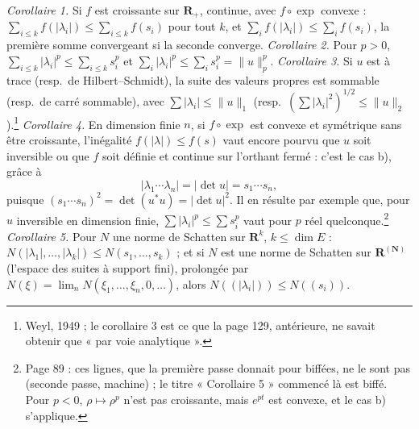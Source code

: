 \documentclass[11pt,a4paper]{article}
\begin{document}
\emph{Corollaire 1.} Si $f$ est croissante sur $\mathbf{R}_{+}$, continue,
avec $f\circ\exp$ convexe : $\sum_{i \leq k} f(|\lambda_i|) \leq \sum_{i
\leq k} f(s_i)$ pour tout $k$, et $\sum_i f(|\lambda_i|) \leq \sum_i f(s_i)$,
la première somme convergeant si la seconde converge.
\emph{Corollaire 2.} Pour $p > 0$, $\sum_{i \leq k} |\lambda_i|^p \leq
\sum_{i \leq k} s_i^p$ et $\sum_i |\lambda_i|^p \leq \sum_i s_i^p = \|u\|_p^p$.
\emph{Corollaire 3.} Si $u$ est à trace (resp.\ de Hilbert--Schmidt), la
suite des valeurs propres est sommable (resp.\ de carré sommable), avec
$\sum |\lambda_i| \leq \|u\|_1$ (resp.\ $(\sum |\lambda_i|^2)^{1/2} \leq
\|u\|_2$).\footnote{Weyl, 1949 ; le corollaire 3 est ce que la page 129,
antérieure, ne savait obtenir que « par voie analytique ».}
\emph{Corollaire 4.} En dimension finie $n$, si $f\circ\exp$ est convexe et
symétrique sans être croissante, l'inégalité $f(|\lambda|) \leq f(s)$ vaut
encore pourvu que $u$ soit inversible ou que $f$ soit définie et continue
sur l'orthant fermé : c'est le cas b), grâce à
\[
  |\lambda_1 \cdots \lambda_n| = |\det u| = s_1 \cdots s_n,
\]
puisque $(s_1 \cdots s_n)^2 = \det(u^{*}u) = |\det u|^2$. Il en résulte
par exemple que, pour $u$ inversible en dimension finie, $\sum |\lambda_i|^p
\leq \sum s_i^p$ vaut pour $p$ réel quelconque.\footnote{Page 89 : ces lignes,
que la première passe donnait pour biffées, ne le sont pas (seconde passe,
machine) ; le titre « Corollaire 5 » commencé là est biffé. Pour $p < 0$,
$\rho \mapsto \rho^p$ n'est pas croissante, mais $e^{pt}$ est convexe, et le
cas b) s'applique.}
\emph{Corollaire 5.} Pour $N$ une norme de Schatten sur $\mathbf{R}^k$,
$k \leq \dim E$ : $N(|\lambda_1|, \ldots, |\lambda_k|) \leq N(s_1, \ldots,
s_k)$ ; et si $N$ est une norme de Schatten sur $\mathbf{R}^{(\mathbf{N})}$
(l'espace des suites à support fini), prolongée par $N(\xi) = \lim_n
N(\xi_1, \ldots, \xi_n, 0, \ldots)$, alors $N((|\lambda_i|)) \leq N((s_i))$.
\end{document}
